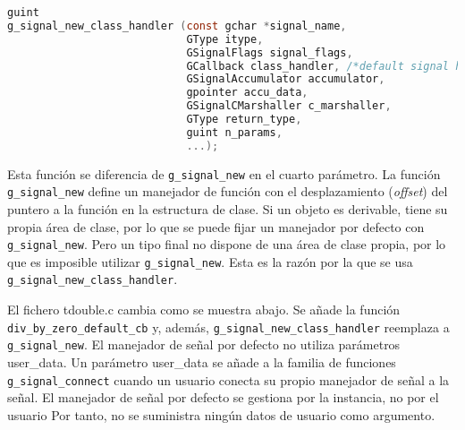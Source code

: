 \begin{lstlisting}[language=C, numbers=none]
guint
g_signal_new_class_handler (const gchar *signal_name,
                            GType itype,
                            GSignalFlags signal_flags,
                            GCallback class_handler, /*default signal handler */
                            GSignalAccumulator accumulator,
                            gpointer accu_data,
                            GSignalCMarshaller c_marshaller,
                            GType return_type,
                            guint n_params,
                            ...);
\end{lstlisting}

Esta función se diferencia de \texttt{g\_signal\_new} en el cuarto parámetro.
La función \texttt{g\_signal\_new} define un manejador de función con el desplazamiento (\emph{offset}) del puntero a la función en la estructura de clase. Si un objeto es derivable, tiene su propia área de clase, por lo que se puede fijar un manejador por defecto con \texttt{g\_signal\_new}. Pero un tipo final no dispone de una área de clase propia, por lo que es imposible utilizar \texttt{g\_signal\_new}. Esta es la razón por la que se usa \texttt{g\_signal\_new\_class\_handler}.

El fichero \textsf{tdouble.c} cambia como se muestra abajo. Se añade la función
\texttt{div\_by\_zero\_default\_cb} y, además, \texttt{g\_signal\_new\_class\_handler} reemplaza a
\texttt{g\_signal\_new}. El manejador de señal por defecto no utiliza parámetros \textsf{user\_data}.
Un parámetro \textsf{user\_data} se añade a la familia de funciones \texttt{g\_signal\_connect} cuando un usuario conecta su propio manejador de señal a la señal. El manejador de señal por defecto se gestiona por la instancia, no por el usuario Por tanto, no se suministra ningún datos de usuario como argumento.

                          
                            

  


